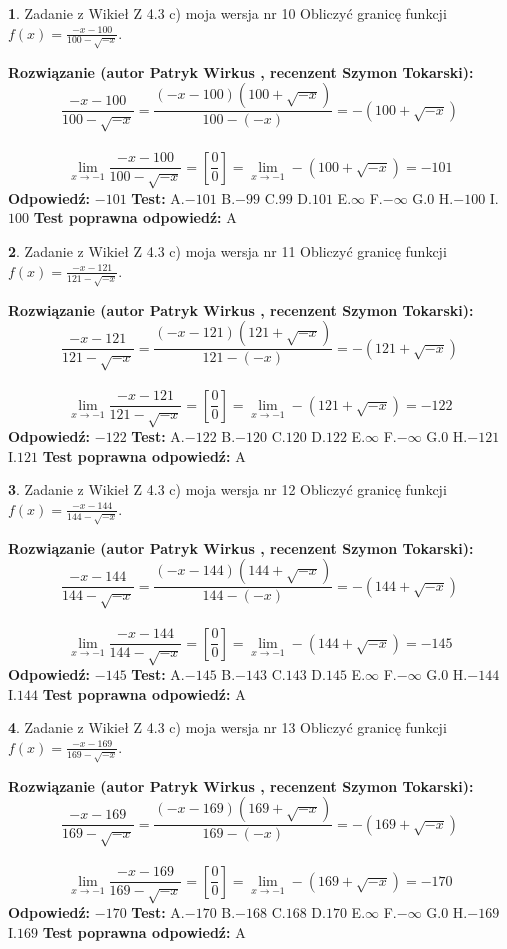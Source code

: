 \documentclass[12pt, a4paper]{article}
\theoremstyle{definition} %
\newtheorem{zad}{}
\newcommand{\zadStart}[1]{\begin{zad}#1\newline}
\newcommand{\zadStop}{\end{zad}}
\newcommand{\rozwStart}[2]{\noindent \textbf{Rozwiązanie (autor #1 , recenzent #2): }\newline}
\newcommand{\rozwStop}{\newline}
\newcommand{\odpStart}{\noindent \textbf{Odpowiedź:}\newline}
\newcommand{\odpStop}{\newline}
\newcommand{\testStart}{\noindent \textbf{Test:}\newline}
\newcommand{\testStop}{\newline}
\newcommand{\kluczStart}{\noindent \textbf{Test poprawna odpowiedź:}\newline}
\newcommand{\kluczStop}{\newline}
\begin{document}
\zadStart{Zadanie z Wikieł Z 4.3 c) moja wersja nr 10}
Obliczyć granicę funkcji $f(x)=\frac{-x-100}{100-\sqrt{-x}}$.
\zadStop
\rozwStart{Patryk Wirkus}{Szymon Tokarski}
$$\frac{-x-100}{100-\sqrt{-x}}=\frac{(-x-100)(100+\sqrt{-x})}{100-(-x)}=-(100+\sqrt{-x})$$
\\
$$\lim\limits_{x\to-1}\frac{-x-100}{100-\sqrt{-x}}=[\frac{0}{0}]=\lim\limits_{x\to-1}-(100+\sqrt{-x}) =-101$$
\rozwStop
\odpStart
$-101$
\odpStop
\testStart
A.$-101$
B.$-99$
C.$99$
D.$101$
E.$\infty$
F.$-\infty$
G.$0$
H.$-100$
I.$100$
\testStop
\kluczStart
A
\kluczStop



\zadStart{Zadanie z Wikieł Z 4.3 c) moja wersja nr 11}
Obliczyć granicę funkcji $f(x)=\frac{-x-121}{121-\sqrt{-x}}$.
\zadStop
\rozwStart{Patryk Wirkus}{Szymon Tokarski}
$$\frac{-x-121}{121-\sqrt{-x}}=\frac{(-x-121)(121+\sqrt{-x})}{121-(-x)}=-(121+\sqrt{-x})$$
\\
$$\lim\limits_{x\to-1}\frac{-x-121}{121-\sqrt{-x}}=[\frac{0}{0}]=\lim\limits_{x\to-1}-(121+\sqrt{-x}) =-122$$
\rozwStop
\odpStart
$-122$
\odpStop
\testStart
A.$-122$
B.$-120$
C.$120$
D.$122$
E.$\infty$
F.$-\infty$
G.$0$
H.$-121$
I.$121$
\testStop
\kluczStart
A
\kluczStop



\zadStart{Zadanie z Wikieł Z 4.3 c) moja wersja nr 12}
Obliczyć granicę funkcji $f(x)=\frac{-x-144}{144-\sqrt{-x}}$.
\zadStop
\rozwStart{Patryk Wirkus}{Szymon Tokarski}
$$\frac{-x-144}{144-\sqrt{-x}}=\frac{(-x-144)(144+\sqrt{-x})}{144-(-x)}=-(144+\sqrt{-x})$$
\\
$$\lim\limits_{x\to-1}\frac{-x-144}{144-\sqrt{-x}}=[\frac{0}{0}]=\lim\limits_{x\to-1}-(144+\sqrt{-x}) =-145$$
\rozwStop
\odpStart
$-145$
\odpStop
\testStart
A.$-145$
B.$-143$
C.$143$
D.$145$
E.$\infty$
F.$-\infty$
G.$0$
H.$-144$
I.$144$
\testStop
\kluczStart
A
\kluczStop



\zadStart{Zadanie z Wikieł Z 4.3 c) moja wersja nr 13}
Obliczyć granicę funkcji $f(x)=\frac{-x-169}{169-\sqrt{-x}}$.
\zadStop
\rozwStart{Patryk Wirkus}{Szymon Tokarski}
$$\frac{-x-169}{169-\sqrt{-x}}=\frac{(-x-169)(169+\sqrt{-x})}{169-(-x)}=-(169+\sqrt{-x})$$
\\
$$\lim\limits_{x\to-1}\frac{-x-169}{169-\sqrt{-x}}=[\frac{0}{0}]=\lim\limits_{x\to-1}-(169+\sqrt{-x}) =-170$$
\rozwStop
\odpStart
$-170$
\odpStop
\testStart
A.$-170$
B.$-168$
C.$168$
D.$170$
E.$\infty$
F.$-\infty$
G.$0$
H.$-169$
I.$169$
\testStop
\kluczStart
A
\kluczStop
\end{document}
